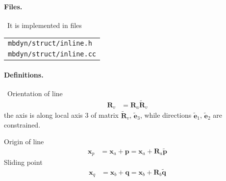 \documentclass[10pt,fleqn,subeqn]{report}
\newcommand{\T}[1]{\bm{#1}}
\newcommand{\TT}[1]{\bm{#1}}
\begin{document}
\paragraph{Files.} \
It is implemented in files

\begin{tabular}{l}
\texttt{mbdyn/struct/inline.h} \\
\texttt{mbdyn/struct/inline.cc}
\end{tabular}

\paragraph{Definitions.} \
Orientation of line
\begin{align}
	\TT{R}_v
	&=
	\TT{R}_a \tilde{\TT{R}}_v
\end{align}
the axis is along local axis 3 of matrix $\tilde{\TT{R}}_v$,
$\tilde{\T{e}}_3$, while directions $\tilde{\T{e}}_1$, $\tilde{\T{e}}_2$
are constrained.

Origin of line
\begin{align}
	\T{x}_p
	&=
	\T{x}_a + \T{p}
	=
	\T{x}_a + \TT{R}_a \tilde{\T{p}}
\end{align}
Sliding point
\begin{align}
	\T{x}_q
	&=
	\T{x}_b + \T{q}
	=
	\T{x}_b + \TT{R}_b \tilde{\T{q}}
\end{align}
\end{document}
